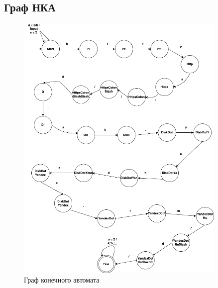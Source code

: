 \documentclass[areasetadvanced]{scrartcl}
\begin{document}
\subsection{Граф НКА}
\begin{figure}[H]
  \centering
  \includegraphics[width=0.9\textwidth]{NFA.png}
  \caption{Граф конечного автомата}
  \label{fig:DFA}
\end{figure}
\end{document}
